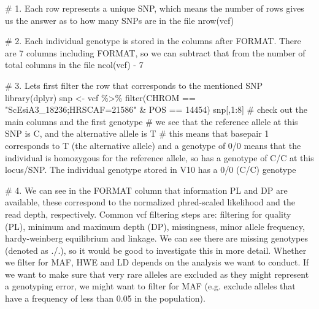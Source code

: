 \documentclass[
  letterpaper,
  DIV=11,
  numbers=noendperiod]{scrreprt}
\newenvironment{Shaded}{}{}
\newcommand{\CommentTok}[1]{\textcolor[rgb]{0.42,0.45,0.49}{#1}}
\newcommand{\DecValTok}[1]{\textcolor[rgb]{0.00,0.36,0.77}{#1}}
\newcommand{\FunctionTok}[1]{\textcolor[rgb]{0.44,0.26,0.76}{#1}}
\newcommand{\NormalTok}[1]{\textcolor[rgb]{0.14,0.16,0.18}{#1}}
\newcommand{\OtherTok}[1]{\textcolor[rgb]{0.44,0.26,0.76}{#1}}
\newcommand{\SpecialCharTok}[1]{\textcolor[rgb]{0.00,0.36,0.77}{#1}}
\newcommand{\StringTok}[1]{\textcolor[rgb]{0.01,0.18,0.38}{#1}}
\begin{document}
\begin{tcolorbox}[enhanced jigsaw, arc=.35mm, left=2mm, titlerule=0mm, rightrule=.15mm, colframe=quarto-callout-tip-color-frame, coltitle=black, colback=white, opacityback=0, bottomtitle=1mm, bottomrule=.15mm, colbacktitle=quarto-callout-tip-color!10!white, breakable, title=\textcolor{quarto-callout-tip-color}{\faLightbulb}\hspace{0.5em}{Code and answer}, toptitle=1mm, toprule=.15mm, opacitybacktitle=0.6, leftrule=.75mm]

\begin{Shaded}
\begin{Highlighting}[]
\CommentTok{\# 1. Each row represents a unique SNP, which means the number of rows gives us the answer as to how many SNPs are in the file}
\FunctionTok{nrow}\NormalTok{(vcf)}

\CommentTok{\# 2. Each individual genotype is stored in the columns after \textquotesingle{}FORMAT\textquotesingle{}. There are 7 columns including \textquotesingle{}FORMAT\textquotesingle{}, so we can subtract that from the number of total columns in the file}
\FunctionTok{ncol}\NormalTok{(vcf) }\SpecialCharTok{{-}} \DecValTok{7}

\CommentTok{\# 3. Let\textquotesingle{}s first filter the row that corresponds to the mentioned SNP}
\FunctionTok{library}\NormalTok{(dplyr)}
\NormalTok{snp }\OtherTok{\textless{}{-}}\NormalTok{ vcf }\SpecialCharTok{\%\textgreater{}\%} \FunctionTok{filter}\NormalTok{(CHROM }\SpecialCharTok{==} \StringTok{"ScEsiA3\_18236;HRSCAF=21586"} \SpecialCharTok{\&}\NormalTok{ POS }\SpecialCharTok{==} \DecValTok{14454}\NormalTok{)}
\NormalTok{snp[,}\DecValTok{1}\SpecialCharTok{:}\DecValTok{8}\NormalTok{] }\CommentTok{\# check out the main columns and the first genotype}
\CommentTok{\# we see that the reference allele at this SNP is C, and the alternative allele is T}
\CommentTok{\# this means that basepair \textquotesingle{}1\textquotesingle{} corresponds to T (the alternative allele) and a genotype of 0/0 means that the individual is homozygous for the reference allele, so has a genotype of C/C at this locus/SNP. The individual genotype stored in V10 has a 0/0 (C/C) genotype}

\CommentTok{\# 4. We can see in the \textquotesingle{}FORMAT\textquotesingle{} column that information PL and DP are available, these correspond to the normalized phred{-}scaled likelihood and the read depth, respectively. Common vcf filtering steps are: filtering for quality (PL), minimum and maximum depth (DP), missingness, minor allele frequency, hardy{-}weinberg equilibrium and linkage. We can see there are missing genotypes (denoted as ./.), so it would be good to investigate this in more detail. Whether we filter for MAF, HWE and LD depends on the analysis we want to conduct. If we want to make sure that very rare alleles are excluded as they might represent a genotyping error, we might want to filter for MAF (e.g. exclude alleles that have a frequency of less than 0.05 in the population).}


\end{Highlighting}
\end{Shaded}
\end{tcolorbox}
\end{document}

